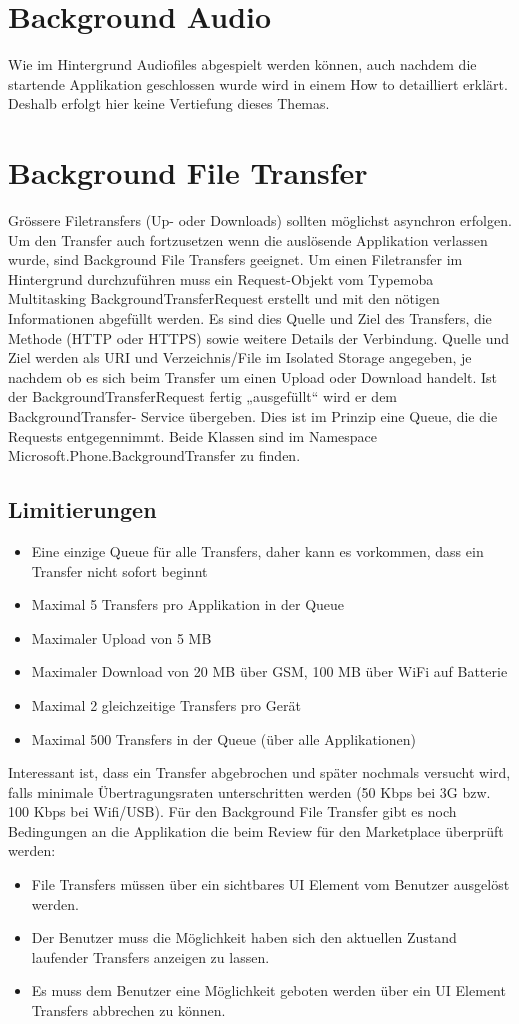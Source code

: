 \documentclass[a4paper,10pt]{scrreprt}
\begin{document}
\section{Background Audio}
Wie im Hintergrund Audiofiles abgespielt werden können, auch nachdem die startende Applikation geschlossen
wurde wird in einem How to detailliert erklärt. Deshalb erfolgt hier keine Vertiefung dieses Themas.
\section{Background File Transfer}
Grössere Filetransfers (Up- oder Downloads) sollten möglichst asynchron erfolgen. Um den Transfer auch
fortzusetzen wenn die auslösende Applikation verlassen wurde, sind Background File Transfers geeignet. Um
einen Filetransfer im Hintergrund durchzuführen muss ein Request-Objekt vom Typemoba
Multitasking
BackgroundTransferRequest erstellt und mit den nötigen Informationen abgefüllt werden. Es sind dies
Quelle und Ziel des Transfers, die Methode (HTTP oder HTTPS) sowie weitere Details der Verbindung. Quelle
und Ziel werden als URI und Verzeichnis/File im Isolated Storage angegeben, je nachdem ob es sich beim
Transfer um einen Upload oder Download handelt.
Ist der BackgroundTransferRequest fertig „ausgefüllt“ wird er dem BackgroundTransfer-
Service übergeben. Dies ist im Prinzip eine Queue, die die Requests entgegennimmt. Beide Klassen sind im
Namespace Microsoft.Phone.BackgroundTransfer zu finden.
\subsection{Limitierungen}
\begin{itemize}
\item Eine einzige Queue für alle Transfers, daher kann es vorkommen, dass ein Transfer nicht sofort beginnt
\item Maximal 5 Transfers pro Applikation in der Queue
\item Maximaler Upload von 5 MB
\item Maximaler Download von 20 MB über GSM, 100 MB über WiFi auf Batterie
\item Maximal 2 gleichzeitige Transfers pro Gerät
\item Maximal 500 Transfers in der Queue (über alle Applikationen) 
\end{itemize}
Interessant ist, dass ein Transfer abgebrochen und später nochmals versucht wird, falls minimale
Übertragungsraten unterschritten werden (50 Kbps bei 3G bzw. 100 Kbps bei Wifi/USB).
Für den Background File Transfer gibt es noch Bedingungen an die Applikation die beim Review für den
Marketplace überprüft werden:
\begin{itemize}
\item File Transfers müssen über ein sichtbares UI Element vom Benutzer ausgelöst werden.
\item Der Benutzer muss die Möglichkeit haben sich den aktuellen Zustand laufender Transfers anzeigen zu
lassen.
\item Es muss dem Benutzer eine Möglichkeit geboten werden über ein UI Element Transfers abbrechen zu
können.
\end{itemize}
\end{document}
